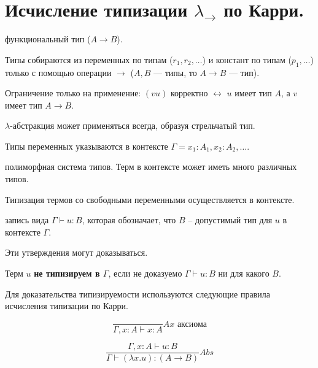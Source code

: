 \section{Исчисление типизации \texorpdfstring{$\lambda_{\to}$}{} по Карри.}


\begin{definition}
функциональный тип ($A \to B$).
\end{definition}


Типы собираются из переменных по типам ($r_1, r_2, \ldots$) и констант по типам ($p_1, \ldots$) только с помощью операции $\to$ ($A, B$ --- типы, то $A \to B$ --- тип).

Ограничение только на применение: $(vu)$ корректно $\leftrightarrow$ $u$ имеет тип $A$, а $v$ имеет тип $A \to B$.

$\lambda$-абстракция может применяться всегда, образуя стрельчатый тип.

Типы переменных указываются в контексте $\Gamma = x_1 : A_1, x_2: A_2, \ldots$.

\begin{definition}
полиморфная система типов.
Терм в контексте может иметь много различных типов.
\end{definition}

\begin{important}
Типизация термов со свободными переменными осуществляется в контексте.
\end{important}

\begin{definition}
запись вида $\Gamma \vdash u : B$, которая обозначает, что $B$ -- допустимый тип для $u$ в контексте $\Gamma$.

Эти утверждения могут доказываться.
\end{definition}

Терм $u$ \textbf{не типизируем в $\Gamma$}, если не доказуемо $\Gamma \vdash u : B$ ни для какого $B$.

Для доказательства типизируемости используются следующие правила исчисления типизации по Карри.

\[
\frac{}{\Gamma, x:A \vdash x:A} Ax \text{ аксиома}
\]

\[
\frac{\Gamma, x:A \vdash u:B}{\Gamma \vdash (\lambda x.u) : (A \to B)} Abs
\]

